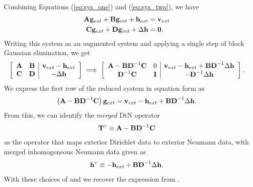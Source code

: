 Combining Equations (\ref{eq:sys_one}) and (\ref{eq:sys_two}), we have
\begin{equation}
\begin{aligned}
\textbf{A} \mathbf g_{ext} + \textbf{B} \mathbf g_{int} + \mathbf h_{ext} & = \mathbf v_{ext} \\
\textbf{C} \mathbf g_{ext} + \textbf{D} \mathbf g_{int} + \Delta \mathbf h & = \mathbf 0.
\end{aligned}
\end{equation}
Writing this system as an augmented system and applying a single step of block Gaussian elimination, we get
\begin{equation}
\left[
\begin{array}{cc|c}
\textbf{A} & \textbf{B} & \mathbf v_{ext} - \mathbf h_{ext}\\
\textbf{C} & \textbf{D} & -\Delta \mathbf h\\
\end{array}\right]
\;
\Longrightarrow 
\;
\left[
\begin{array}{cc|c}
\textbf{A} - \textbf{B}\textbf{D}^{-1}\textbf{C} & 0 & \mathbf v_{ext} - \mathbf h_{ext} + \textbf{B} \textbf{D}^{-1}\Delta \mathbf h\\
\textbf{D}^{-1}\textbf{C}      & \textbf{I} & -\textbf{D}^{-1}\Delta \mathbf h
\end{array}\right].
\label{eq:reduced_system}
\end{equation}
We express the first row of the reduced system in equation form as 
\begin{equation}
\left(\textbf{A} - \textbf{B}\textbf{D}^{-1}\textbf{C}\right) \mathbf g_{ext} = \mathbf v_{ext} - \mathbf h_{ext} + \textbf{B} \textbf{D}^{-1}\Delta \mathbf h.
\label{eq:complete_ops}
\end{equation}
From this, we can identify the {\em merged} DtN operator 
\begin{equation}
\mathbf T^{\tau} \equiv \mathbf{A} - \mathbf{B} \mathbf{D}^{-1} \mathbf{C} 
\label{eq:Ttau-merged}
\end{equation}
as the operator that maps exterior Dirichlet data to exterior Neumann data, with merged inhomogeneous Neumann data given as
\begin{equation}
\mathbf h^{\tau} \equiv -\mathbf h_{ext} + \textbf{B} \textbf{D}^{-1}\Delta \mathbf h. 
\label{eq:htau-merged}
\end{equation}
With these choices of \Ttau and \htau  we recover the expression from .

